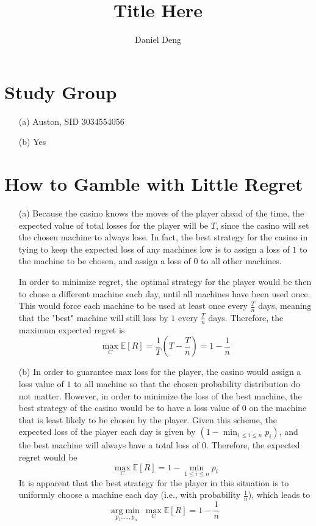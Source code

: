 \documentclass[11pt]{article}
\title{Title Here}
\author{Daniel Deng}
\date{}
\theoremstyle{definition}
\theoremstyle{remark}
\begin{document}
\maketitle

\section{Study Group}
\begin{enumerate}
\item[(a)] Auston, SID 3034554056
\item[(b)] Yes
\end{enumerate}
\clearpage

\section{How to Gamble with Little Regret}
\begin{enumerate}
\item[(a)] Because the casino knows the moves of the player ahead of the time, the expected value of total losses for the player will be $T$, since the casino will set the chosen machine to always lose. In fact, the best strategy for the casino in tying to keep the expected loss of any machines low is to assign a loss of $1$ to the machine to be chosen, and assign a loss of $0$ to all other machines. 

In order to minimize regret, the optimal strategy for the player would be then to chose a different machine each day, until all machines have been used once. This would force each machine to be used at least once every $\frac{T}{n}$ days, meaning that the "best" machine will still loss by $1$ every $\frac{T}{n}$ days. Therefore, the maximum expected regret is
\[
\max_C \mathbb{E}[R] = \frac{1}{T}\left(T-\frac{T}{n}\right) = 1 - \frac{1}{n}
\]

\item[(b)] In order to guarantee max loss for the player, the casino would assign a loss value of $1$ to all machine so that the chosen probability distribution do not matter. However, in order to minimize the loss of the best machine, the best strategy of the casino would be to have a loss value of $0$ on the machine that is least likely to be chosen by the player. Given this scheme, the expected loss of the player each day is given by $(1-\min_{1\leq i\leq n} p_i)$, and the best machine will always have a total loss of $0$. Therefore, the expected regret would be
\[
\max_C \mathbb{E}[R] = 1-\min_{1\leq i\leq n} p_i
\]
It is apparent that the best strategy for the player in this situation is to uniformly choose a machine each day (i.e., with probability $\frac{1}{n}$), which leads to
\[
\underset{p_1,\dots,p_n}{\mathrm{arg}\!\min} \, \max_C \mathbb{E}[R] = 1 - \frac{1}{n}
\]
\end{enumerate}
\clearpage
\end{document}
